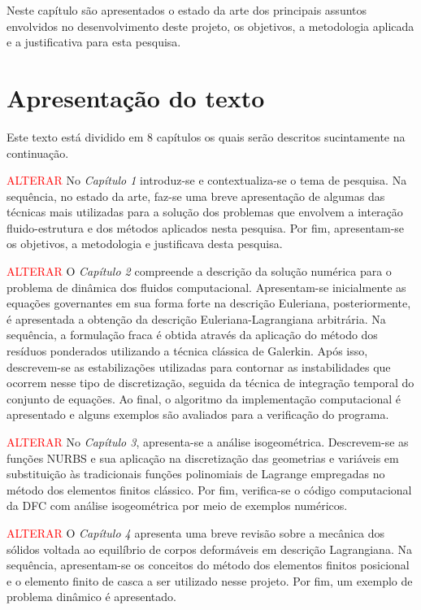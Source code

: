 \documentclass[tese_patricia.tex]{subfiles}
\begin{document}
Neste capítulo são apresentados o estado da arte dos principais assuntos envolvidos no desenvolvimento deste projeto, os objetivos, a metodologia aplicada e a justificativa para esta pesquisa.


\section{Apresentação do texto}

Este texto está dividido em 8 capítulos os quais serão descritos sucintamente na continuação.

\textcolor{red}{ALTERAR}
No \textit{Capítulo 1} introduz-se e contextualiza-se o tema de pesquisa. Na sequência, no estado da arte, faz-se uma breve apresentação de algumas das técnicas mais utilizadas para a solução dos problemas que envolvem a interação fluido-estrutura e dos métodos aplicados nesta pesquisa. Por fim, apresentam-se os objetivos, a metodologia e justificava desta pesquisa.

\textcolor{red}{ALTERAR}
O \textit{Capítulo 2} compreende a descrição da solução numérica para o problema de dinâmica dos fluidos computacional. Apresentam-se inicialmente as equações governantes em sua forma forte na descrição Euleriana, posteriormente, é apresentada a obtenção da descrição Euleriana-Lagrangiana arbitrária. Na sequência, a formulação fraca é obtida através da aplicação do método dos resíduos ponderados utilizando a técnica clássica de Galerkin. Após isso, descrevem-se as estabilizações utilizadas para contornar as instabilidades que ocorrem nesse tipo de discretização, seguida da técnica de integração temporal do conjunto de equações. Ao final, o algoritmo da implementação computacional é apresentado e alguns exemplos são avaliados para a verificação do programa.

\textcolor{red}{ALTERAR}
No \textit{Capítulo 3}, apresenta-se a análise isogeométrica. Descrevem-se as funções NURBS e sua aplicação na discretização das geometrias e variáveis em substituição às tradicionais funções polinomiais de Lagrange empregadas no método dos elementos finitos clássico. Por fim, verifica-se o código computacional da DFC com análise isogeométrica por meio de exemplos numéricos.

\textcolor{red}{ALTERAR}
O \textit{Capítulo 4} apresenta uma breve revisão sobre a mecânica dos sólidos voltada ao equilíbrio de corpos deformáveis em descrição Lagrangiana.  Na sequência, apresentam-se os conceitos do método dos elementos finitos posicional e o elemento finito de casca a ser utilizado nesse projeto. Por fim, um exemplo de problema dinâmico é apresentado.
\end{document}
